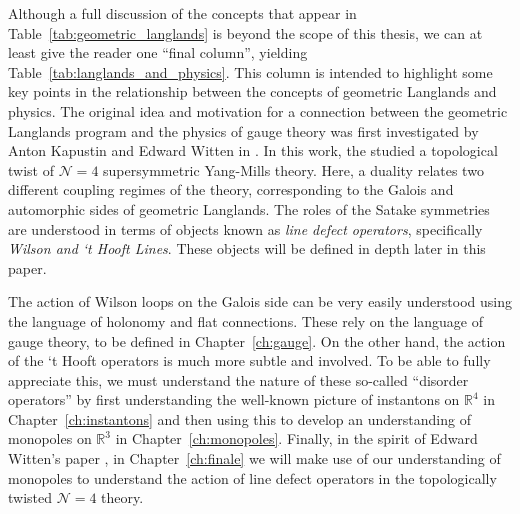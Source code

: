Although a full discussion of the concepts that appear in Table~\ref{tab:geometric_langlands} is beyond the scope of this thesis, we can at least give the reader one ``final column'', yielding Table~\ref{tab:langlands_and_physics}. This column is intended to highlight some key points in the relationship between the concepts of geometric Langlands and physics. The original idea and motivation for a connection between the geometric Langlands program and the physics of gauge theory was first investigated by Anton Kapustin and Edward Witten in \cite{kapustin2006}. In this work, the studied a topological twist of $\mathcal N = 4$ supersymmetric Yang-Mills theory. Here, a duality relates two different coupling regimes of the theory, corresponding to the Galois and automorphic sides of geometric Langlands. The roles of the Satake symmetries are understood in terms of objects known as \emph{line defect operators}, specifically \emph{Wilson and `t Hooft Lines}. These objects will be defined in depth later in this paper. 


The action of Wilson loops on the Galois side can be very easily understood using the language of holonomy and flat connections. These rely on the language of gauge theory, to be defined in Chapter~\ref{ch:gauge}. On the other hand, the action of the `t Hooft operators is much more subtle and involved. To be able to fully appreciate this, we must understand the nature of these so-called ``disorder operators'' by first understanding the well-known picture of instantons on $\mathbb R^4$ in Chapter~\ref{ch:instantons} and then using this to develop an understanding of monopoles on $\mathbb R^3$ in Chapter~\ref{ch:monopoles}. Finally, in the spirit of Edward Witten's paper \cite{witten2010}, in Chapter~\ref{ch:finale} we will make use of our understanding of monopoles to understand the action of line defect operators in the topologically twisted $\mathcal N=4$ theory.

